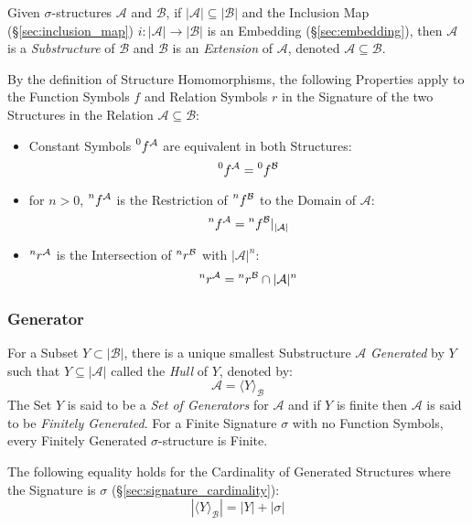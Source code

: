 Given $\sigma$-structures $\mathcal{A}$ and $\mathcal{B}$, if
$|\mathcal{A}| \subseteq |\mathcal{B}|$ and the Inclusion Map
(\S\ref{sec:inclusion_map}) $i : |\mathcal{A}| \rightarrow
|\mathcal{B}|$ is an Embedding (\S\ref{sec:embedding}), then
$\mathcal{A}$ is a \emph{Substructure} of $\mathcal{B}$ and
$\mathcal{B}$ is an \emph{Extension} of $\mathcal{A}$, denoted
$\mathcal{A} \subseteq \mathcal{B}$.

By the definition of Structure Homomorphisms, the following Properties
apply to the Function Symbols $f$ and Relation Symbols $r$ in the
Signature of the two Structures in the Relation $\mathcal{A} \subseteq
\mathcal{B}$:
\begin{itemize}
    \item Constant Symbols $\prescript{0}{}{f}^\mathcal{A}$ are
      equivalent in both Structures:
\[
    \prescript{0}{}{f}^\mathcal{A} = \prescript{0}{}{f}^\mathcal{B}
\]
    \item for $n >0$, $\prescript{n}{}{f}^\mathcal{A}$ is the
      Restriction of $\prescript{n}{}{f}^\mathcal{B}$ to the Domain of
      $\mathcal{A}$:
\[
    \prescript{n}{}{f}^\mathcal{A}
    = \prescript{n}{}{f}^\mathcal{B} |_{|\mathcal{A}|}
\]
    \item $\prescript{n}{}{r}^\mathcal{A}$ is the Intersection of
      $\prescript{n}{}{r}^\mathcal{B}$ with $|\mathcal{A}|^n$:
\[
    \prescript{n}{}{r}^\mathcal{A}
    = \prescript{n}{}{r}^\mathcal{B} \cap |\mathcal{A}|^n
\]
\end{itemize}



\subsubsection{Generator} \label{sec:generator}

For a Subset $Y \subset |\mathcal{B}|$, there is a unique smallest
Substructure $\mathcal{A}$ \emph{Generated} by $Y$ such that $Y
\subseteq |\mathcal{A}|$ called the \emph{Hull} of $Y$, denoted by:
\[
    \mathcal{A} = \langle Y \rangle_\mathcal{B}
\]
The Set $Y$ is said to be a \emph{Set of Generators} for $\mathcal{A}$
and if $Y$ is finite then $\mathcal{A}$ is said to be \emph{Finitely
  Generated}. For a Finite Signature $\sigma$ with no Function
Symbols, every Finitely Generated $\sigma$-structure is Finite.

The following equality holds for the Cardinality of Generated
Structures where the Signature is $\sigma$
(\S\ref{sec:signature_cardinality}):
\[
  |\langle Y \rangle_\mathcal{B}| = |Y| + |\sigma|
\]



